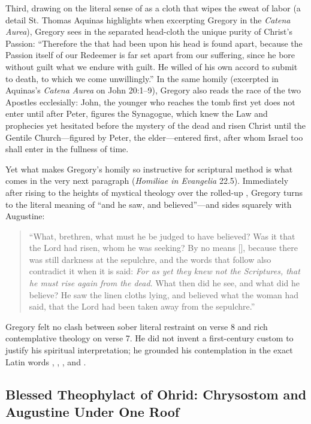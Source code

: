 Third, drawing on the literal sense of  as a cloth that wipes the sweat of labor (a detail St. Thomas Aquinas highlights when excerpting Gregory in the \emph{Catena Aurea}), Gregory sees in the separated head-cloth the unique purity of Christ's Passion: ``Therefore the  that had been upon his head is found apart, because the Passion itself of our Redeemer is far set apart from our suffering, since he bore without guilt what we endure with guilt. He willed of his own accord to submit to death, to which we come unwillingly.'' In the same homily (excerpted in Aquinas's \emph{Catena Aurea} on John 20:1--9), Gregory also reads the race of the two Apostles ecclesially: John, the younger who reaches the tomb first yet does not enter until after Peter, figures the Synagogue, which knew the Law and prophecies yet hesitated before the mystery of the dead and risen Christ until the Gentile Church---figured by Peter, the elder---entered first, after whom Israel too shall enter in the fullness of time.

Yet what makes Gregory's homily so instructive for scriptural method is what comes in the very next paragraph (\emph{Homiliae in Evangelia} 22.5). Immediately after rising to the heights of mystical theology over the rolled-up , Gregory turns to the literal meaning of ``and he saw, and believed''---and sides squarely with Augustine:
\begin{quote}
``What, brethren, what must he be judged to have believed? Was it that the Lord had risen, whom he was seeking? By no means [], because there was still darkness at the sepulchre, and the words that follow also contradict it when it is said: \emph{For as yet they knew not the Scriptures, that he must rise again from the dead}. What then did he see, and what did he believe? He saw the linen cloths lying, and believed what the woman had said, that the Lord had been taken away from the sepulchre.''
\end{quote}
Gregory felt no clash between sober literal restraint on verse 8 and rich contemplative theology on verse 7. He did not invent a first-century custom to justify his spiritual interpretation; he grounded his contemplation in the exact Latin words , , , and .

\subsection{Blessed Theophylact of Ohrid: Chrysostom and Augustine Under One Roof}

